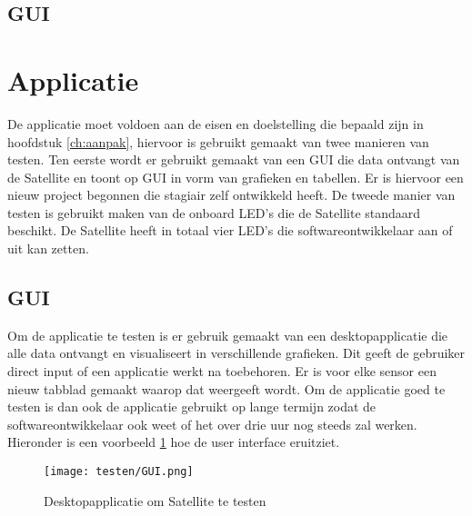 \newpage

\subsection{GUI}
\section{Applicatie}
De applicatie moet voldoen aan de eisen en doelstelling die bepaald zijn in hoofdstuk \ref{ch:aanpak}, hiervoor is gebruikt gemaakt van twee manieren van testen. Ten eerste wordt er gebruikt gemaakt van een GUI die data ontvangt van de Satellite en toont op GUI in vorm van grafieken en tabellen. Er is hiervoor een nieuw project begonnen die stagiair zelf ontwikkeld heeft. De tweede manier van testen is gebruikt maken van de onboard LED's die de Satellite standaard beschikt. De Satellite heeft in totaal vier LED's die softwareontwikkelaar aan of uit kan zetten. 



\subsection{GUI}
Om de applicatie te testen is er gebruik gemaakt van een desktopapplicatie die alle data ontvangt en visualiseert in verschillende grafieken. Dit geeft de gebruiker direct input of een applicatie werkt na toebehoren. Er is voor elke sensor een nieuw tabblad gemaakt waarop dat weergeeft wordt. Om de applicatie goed te testen is dan ook de applicatie gebruikt op lange termijn zodat de softwareontwikkelaar ook weet of het over drie uur nog steeds zal werken. Hieronder is een voorbeeld \ref{fig:guitest} hoe de user interface eruitziet. 
\begin{figure}[h!]
	\centering
	\caption{Desktopapplicatie om Satellite te testen}
	\label{fig:guitest}
	\texttt{[image: testen/GUI.png]}
\end{figure}

\newpage
